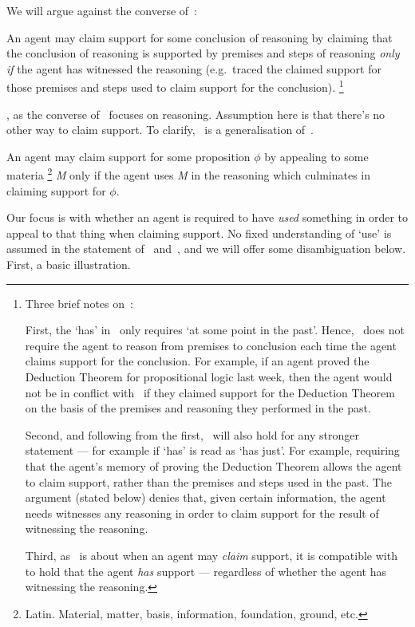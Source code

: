 \begin{note}[Focus]
  We will argue against the converse of~\USE{}:

  \begin{proposition}[\ESU{-} --- \ESU{}]\label{denied-claim}
    An agent may claim support for some conclusion of reasoning by claiming that the conclusion of reasoning is supported by premises and steps of reasoning \emph{only if} the agent has witnessed the reasoning (e.g.\ traced the claimed support for those premises and steps used to claim support for the conclusion).\nolinebreak
      \footnote{
    Three brief notes on~\ESU{}:

    First, the `has' in~\ESU{} only requires `at some point in the past'.
    Hence,~\ESU{} does not require the agent to reason from premises to conclusion each time the agent claims support for the conclusion.
    For example, if an agent proved the Deduction Theorem for propositional logic last week, then the agent would not be in conflict with~\ESU{} if they claimed support for the Deduction Theorem on the basis of the premises and reasoning they performed in the past.

    Second, and following from the first,~\ESU{} will also hold for any stronger statement --- for example if `has' is read as `has just'.
    For example, requiring that the agent's memory of proving the Deduction Theorem allows the agent to claim support, rather than the premises and steps used in the past.
    The argument (stated below) denies that, given certain information, the agent needs witnesses any reasoning in order to claim support for the result of witnessing the reasoning.

    Third, as~\ESU{} is about when an agent may \emph{claim} support, it is compatible with~\ESU{} to hold that the agent \emph{has} support --- regardless of whether the agent has witnessing the reasoning.
  }
  \end{proposition}

  \ESU{}, as the converse of~\USE{} focuses on reasoning.
  {
    \color{red}
    Assumption here is that there's no other way to claim support.
  }
  To clarify,~\gESU{} is a generalisation of~\ESU{}.

  \begin{proposition}[\gESU{}]
    An agent may claim support for some proposition \(\phi\) by appealing to some materia\nolinebreak
    \footnote{Latin.
      Material, matter, basis, information, foundation, ground, etc.
    }
    \emph{M} only if the agent uses \emph{M} in the reasoning which culminates in claiming support for \(\phi\).
  \end{proposition}
  Our focus is with whether an agent is required to have \emph{used} something in order to appeal to that thing when claiming support.
  No fixed understanding of `use' is assumed in the statement of~\ESU{} and~\gESU{}, and we will offer some disambiguation below.
  First, a basic illustration.
\end{note}

